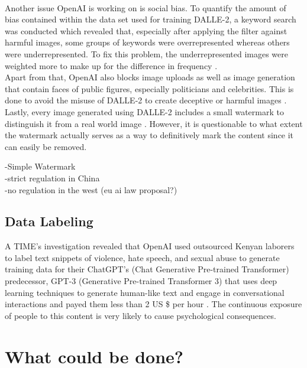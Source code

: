 \documentclass[10pt,twocolumn,twoside]{osajnl}
\begin{document}
\\
Another issue OpenAI is working on is social bias. To quantify the amount of bias contained within the data set used for training DALLE-2, a keyword search was conducted 
which revealed that, especially after applying the filter against harmful images, some groups of keywords were overrepresented whereas others were underrepresented. 
To fix this problem, the underrepresented images were weighted more to make up for the difference in frequency \cite{openaifilters}. 
\\
Apart from that, OpenAI also blocks image uploads as well as image generation that contain faces of public figures, especially politicians and celebrities. 
This is done to avoid the misuse of DALLE-2 to create deceptive or harmful images \cite{openaiimage}. 
\\
Lastly, every image generated using DALLE-2 includes a small watermark to distinguish it from a real world image \cite{openaicp}. 
However, it is questionable to what extent the watermark actually serves as a way to definitively mark the content since it can easily be removed.

-Simple Watermark\\
-strict regulation in China\\
-no regulation in the west (eu ai law proposal?)\\

\subsection{Data Labeling}
A TIME's investigation revealed that OpenAI used outsourced Kenyan laborers to label text snippets of violence, hate speech, and sexual abuse to generate training data for their ChatGPT’s (Chat Generative Pre-trained Transformer) predecessor, GPT-3 (Generative Pre-trained Transformer 3) that uses deep learning techniques to generate human-like text and engage in conversational interactions and payed them less than 2 US \$ per hour \cite{KenyaExclusive}. The continuous exposure of people to this content is very likely to cause psychological consequences.

\section{What could be done?}
\end{document}
